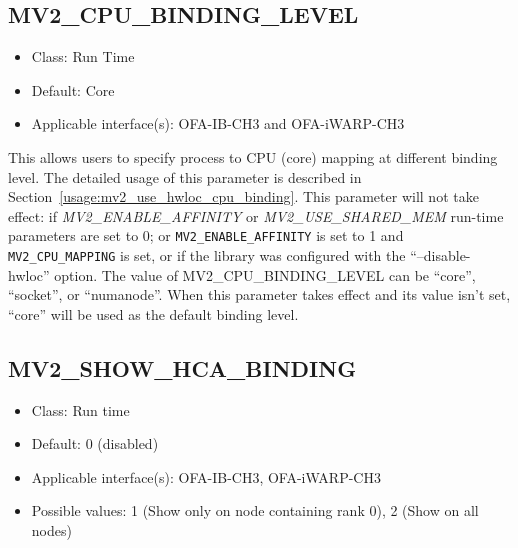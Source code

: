 

\subsection{MV2\_CPU\_BINDING\_LEVEL}
\label{def:mv2-cpu-binding-level}
\begin{itemize}
    \item Class: Run Time
    \item Default: Core
    \item Applicable interface(s):  OFA-IB-CH3 and OFA-iWARP-CH3
\end{itemize}

This allows users to specify process to CPU (core) mapping at different
binding level. The detailed usage of this parameter is described in
Section~\ref{usage:mv2_use_hwloc_cpu_binding}. This parameter will not take
effect: if \textit {MV2\_ENABLE\_AFFINITY} or \textit{MV2\_USE\_SHARED\_MEM}
run-time parameters
are set to 0; or \texttt{MV2\_ENABLE\_AFFINITY} is set to 1 and
\texttt{MV2\_CPU\_MAPPING} is
set, or if the library was configured with the ``--disable-hwloc'' option.
The value of MV2\_CPU\_BINDING\_LEVEL can be ``core'', ``socket'', or
``numanode''. When this parameter takes effect and its value isn't set,
``core'' will be used as the default binding level.

\subsection{MV2\_SHOW\_HCA\_BINDING}
\label{def:show-hca-binding}
\begin{itemize}
    \item Class: Run time
    \item Default: 0 (disabled)
    \item Applicable interface(s):  OFA-IB-CH3, OFA-iWARP-CH3
    \item Possible values: 1 (Show only on node containing rank 0), 2 (Show on all nodes)
\end{itemize}

